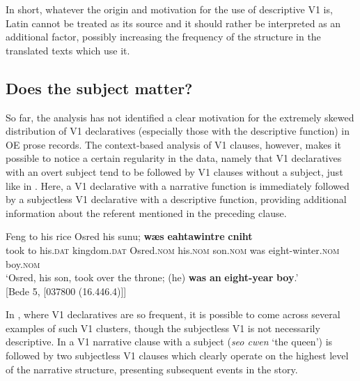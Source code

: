\documentclass[output=paper,colorlinks,citecolor=brown]{langscibook}
\begin{document}
In short, whatever the origin and motivation for the use of descriptive V1 is, Latin cannot be treated as its source and it should rather be interpreted as an additional factor, possibly increasing the frequency of the structure in the translated texts which use it.


\subsection{Does the subject matter?}\label{sec:cichosz:4.3}
So far, the analysis has not identified a clear motivation for the extremely skewed distribution of V1 declaratives (especially those with the descriptive function) in OE prose records. The context-based analysis of V1 clauses, however, makes it possible to notice a certain regularity in the data, namely that V1 declaratives with an overt subject tend to be followed by V1 clauses without a subject, just like in . Here, a V1 declarative with a narrative function is immediately followed by a subjectless V1 declarative with a descriptive function, providing additional information about the referent mentioned in the preceding clause.

\ea \label{ex:cichosz:15}
\gll Feng   to   his     rice     Osred     his     sunu; \textbf{wæs}   \textbf{eahtawintre} \textbf{cniht}\\
took   to   his.\textsc{dat}  kingdom.\textsc{dat}   Osred.\textsc{nom}   his.\textsc{nom}   son.\textsc{nom} was   eight-winter.\textsc{nom}   boy.\textsc{nom}\\
\glt ‘Osred, his son, took over the throne; (he) \textbf{was} \textbf{an} \textbf{eight-year} \textbf{boy}.' \\ \hfill [Bede 5, [037800 (16.446.4)]]
\z 

In , where V1 declaratives are so frequent, it is possible to come across several examples of such V1 clusters, though the subjectless V1 is not necessarily descriptive. In  a V1 narrative clause with a subject (\textit{seo cwen} {‘the queen') is followed by two subjectless V1 clauses which clearly operate on the highest level of the narrative structure, presenting subsequent events in the story.}
\end{document}
